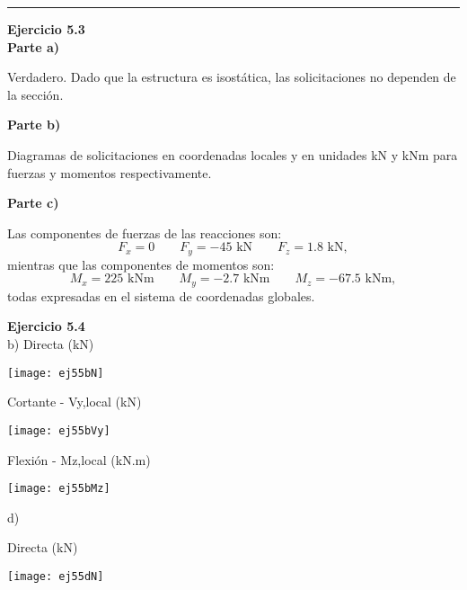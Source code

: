 \hrule
\vspace{5mm}
\textbf{Ejercicio 5.3}\\



\textbf{Parte a)}

Verdadero. Dado que la estructura es isostática, las solicitaciones no dependen de la  sección.

\vspace{5mm}

\textbf{Parte b)}

Diagramas de solicitaciones en coordenadas locales y en unidades kN y kNm para fuerzas y momentos respectivamente.


\begin{center}
	\def\svgwidth{0.65\textwidth}
	
\end{center}

\vspace{5mm}

\textbf{Parte c)}

Las componentes de fuerzas de las reacciones son:
$$
F_x = 0 \qquad F_y = -45 \text{ kN} \qquad F_z = 1.8 \text{ kN},
$$
%
mientras que las componentes de momentos son:
$$
M_x = 225  \text{ kNm} \qquad M_y = -2.7 \text{ kNm} \qquad M_z = -67.5 \text{ kNm},
$$
%
todas expresadas en el sistema de coordenadas globales.








\textbf{Ejercicio 5.4}\\


b)
Directa (kN)

\begin{center}
	\texttt{[image: ej55bN]}
\end{center}


Cortante - Vy,local (kN)

\begin{center}
	\texttt{[image: ej55bVy]}
\end{center}

Flexión - Mz,local (kN.m)

\begin{center}
	\texttt{[image: ej55bMz]}
\end{center}

d)

Directa (kN)

\begin{center}
	\texttt{[image: ej55dN]}
\end{center}


